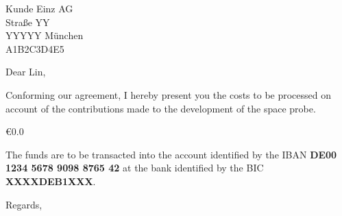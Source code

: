 \documentclass[11pt]{letter}
\begin{document}
\begin{letter}{
  Kunde Einz AG \\
  Stra{\ss}e YY \\
  YYYYY M\"unchen \\
  A1B2C3D4E5
}

  \opening{Dear Lin,}

  Conforming our agreement, I hereby present you the costs to be processed on
  account of the contributions made to the development of the space probe.

\begin{invoice}{\euro}{0.0} %

\end{invoice}

  The funds are to be transacted into the account identified by the
  IBAN \textbf{DE00 1234 5678 9098 8765 42} at the bank identified by the BIC
  \textbf{XXXXDEB1XXX}.

  \closing{Regards,}

\end{letter}
\end{document}
